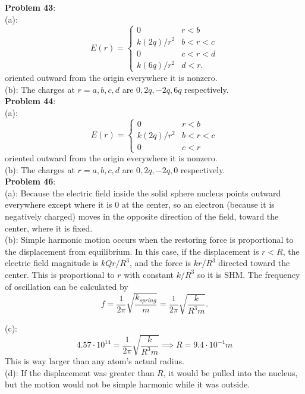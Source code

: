 \documentclass{amsart}
\begin{document}
\textbf{Problem 43}:\\

(a): 
$$
E(r) = \begin{cases}
	0 & r<b\\
	k(2q)/r^2 & b<r<c\\
	0 & c<r<d\\
	k(6q)/r^2 & d<r.
\end{cases}
$$
oriented outward from the origin everywhere it is nonzero.\\

(b): The charges at $r=a,b,c,d$ are $0,2q,-2q,6q$ respectively.\\

\textbf{Problem 44}:\\

(a): 
$$
E(r) = \begin{cases}
	0 & r<b\\
	k(2q)/r^2 & b<r<c\\
	0 & c<r
\end{cases}
$$
oriented outward from the origin everywhere it is nonzero.\\

(b): The charges at $r=a,b,c,d$ are $0,2q,-2q,0$ respectively.\\

\textbf{Problem 46}:\\

(a): Because the electric field inside the solid sphere nucleus points outward everywhere except where it is 0 at the center, so an electron (because it is negatively charged) moves in the opposite direction of the field, toward the center, where it is fixed.\\

(b): Simple harmonic motion occurs when the restoring force is proportional to the displacement from equilibrium. In this case, if the displacement is $r<R$, the electric field magnitude is $kQr/R^3$, and the force is $kr/R^3$ directed toward the center. This is proportional to $r$ with constant $k/R^3$ so it is SHM. The frequency of oscillation can be calculated by
$$
f = \frac{1}{2\pi} \sqrt{\frac{k_{spring}}{m}} = \frac{1}{2\pi} \sqrt{\frac{k}{R^3m}}.
$$

(c):
$$
4.57 \cdot 10^{14} = \frac{1}{2\pi} \sqrt{\frac{k}{R^3m}} \implies R = 9.4\cdot 10^{-4} m
$$
This is way larger than any atom's actual radius.\\

(d): If the displacement was greater than $R$, it would be pulled into the nucleus, but the motion would not be simple harmonic while it was outside.\\
\end{document}
